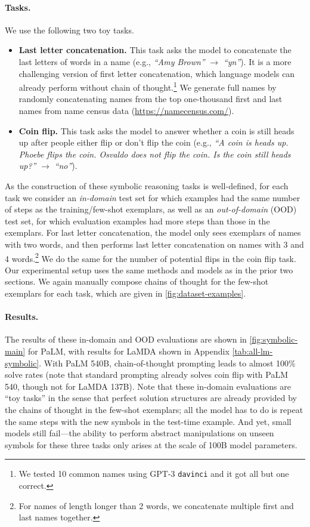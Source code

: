 \paragraph{Tasks.}
We use the following two toy tasks.

\begin{itemize}[leftmargin=*,topsep=0pt]
    \itemsep0em \item \textbf{Last letter concatenation.} This task asks the model to concatenate the last letters of words in a name (e.g., \textit{``Amy Brown''} $\rightarrow$ \textit{``yn''}). 
    It is a more challenging version of first letter concatenation, which language models can already perform without chain of thought.\footnote{We tested 10 common names using GPT-3 \texttt{davinci} and it got all but one correct.} We generate full names by randomly concatenating names from the top one-thousand first and last names from name census data ({\small{\url{https://namecensus.com/}}}).
    \item \textbf{Coin flip.} This task asks the model to answer whether a coin is still heads up after people either flip or don't flip the coin (e.g., \textit{``A coin is heads up. Phoebe flips the coin. Osvaldo does not flip the coin. Is the coin still heads up?''} $\rightarrow$ \textit{``no''}).
\end{itemize}

As the construction of these symbolic reasoning tasks is well-defined, for each task we consider an \textit{in-domain} test set for which examples had the same number of steps as the training/few-shot exemplars, as well as an \textit{out-of-domain} (OOD) test set, for which evaluation examples had more steps than those in the exemplars. For last letter concatenation, the model only sees exemplars of names with two words, and then performs last letter concatenation on names with 3 and 4 words.\footnote{For names of length longer than 2 words, we concatenate multiple first and last names together.} We do the same for the number of potential flips in the coin flip task. Our experimental setup uses the same methods and models as in the prior two sections. We again manually compose chains of thought for the few-shot exemplars for each task, which are given in \ref{fig:dataset-examples}.

\paragraph{Results.}
The results of these in-domain and OOD evaluations are shown in \ref{fig:symbolic-main} for PaLM, with results for LaMDA shown in Appendix \ref{tab:all-lm-symbolic}.
With PaLM 540B, chain-of-thought prompting leads to almost 100\% solve rates (note that standard prompting already solves coin flip with PaLM 540, though not for LaMDA 137B). Note that these in-domain evaluations are ``toy tasks'' in the sense that perfect solution structures are already provided by the chains of thought in the few-shot exemplars; all the model has to do is repeat the same steps with the new symbols in the test-time example. And yet, small models still fail---the ability to perform abstract manipulations on unseen symbols for these three tasks only arises at the scale of 100B model parameters.

